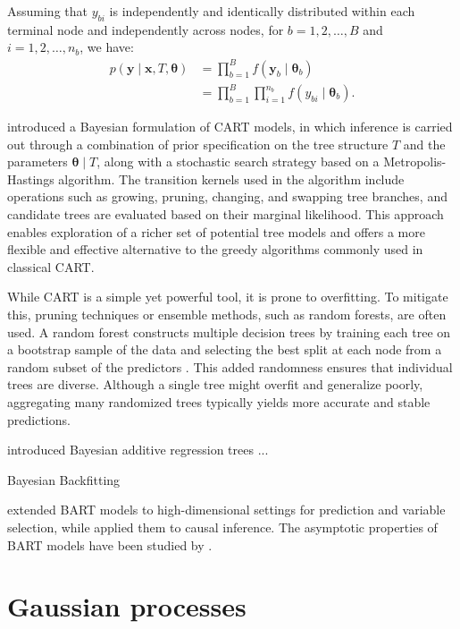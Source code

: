 Assuming that \( y_{bi} \) is independently and identically distributed within each terminal node and independently across nodes, for \( b = 1, 2, \dots, B \) and \( i = 1, 2, \dots, n_b \), we have:
\begin{align*}
	p(\mathbf{y} \mid \mathbf{x}, T, \boldsymbol{\theta}) &= \prod_{b=1}^B f(\mathbf{y}_b \mid \boldsymbol{\theta}_b) \\
	&= \prod_{b=1}^B \prod_{i=1}^{n_b} f(y_{bi} \mid \boldsymbol{\theta}_b).
\end{align*}

\cite{chipman1998bayesian} introduced a Bayesian formulation of CART models, in which inference is carried out through a combination of prior specification on the tree structure \( T \) and the parameters \( \boldsymbol{\theta} \mid T \), along with a stochastic search strategy based on a Metropolis-Hastings algorithm. The transition kernels used in the algorithm include operations such as growing, pruning, changing, and swapping tree branches, and candidate trees are evaluated based on their marginal likelihood. This approach enables exploration of a richer set of potential tree models and offers a more flexible and effective alternative to the greedy algorithms commonly used in classical CART. 

While CART is a simple yet powerful tool, it is prone to overfitting. To mitigate this, pruning techniques or ensemble methods, such as random forests, are often used. A random forest constructs multiple decision trees by training each tree on a bootstrap sample of the data and selecting the best split at each node from a random subset of the predictors \cite{breiman2001random}. This added randomness ensures that individual trees are diverse. Although a single tree might overfit and generalize poorly, aggregating many randomized trees typically yields more accurate and stable predictions.

\cite{chipman2010bart} introduced Bayesian additive regression trees ...

Bayesian Backfitting \cite{hastie2000bayesian}

\cite{linero2018bayesian} extended BART models to high-dimensional settings for prediction and variable selection, while \cite{hill2011bayesian, hahn2020bayesian} applied them to causal inference. The asymptotic properties of BART models have been studied by \cite{rockova2019on, rockova2020posterior, rockova2020semiparametric}.




\section{Gaussian processes}\label{13_4}

